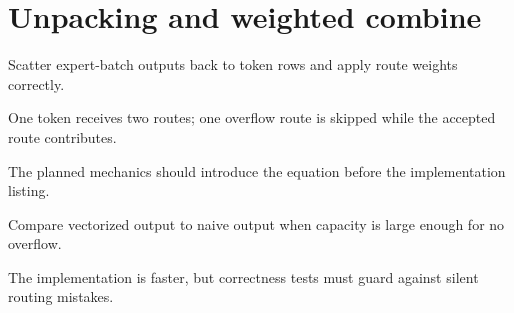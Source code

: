 \section{Unpacking and weighted combine}
\label{sec:ch06-unpacking-and-weighted-combine}

Scatter expert-batch outputs back to token rows and apply route weights correctly.



One token receives two routes; one overflow route is skipped while the accepted route contributes.



The planned mechanics should introduce the equation before the implementation listing.





\begin{checkpointbox}
Compare vectorized output to naive output when capacity is large enough for no overflow.
\end{checkpointbox}

The implementation is faster, but correctness tests must guard against silent routing mistakes.
